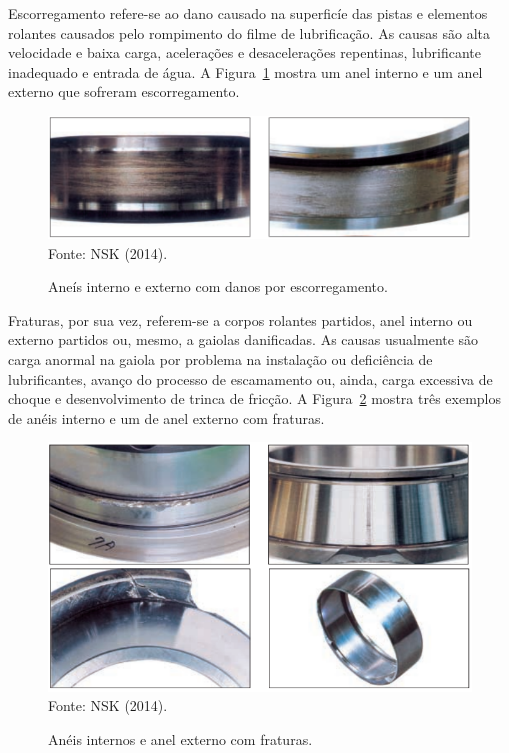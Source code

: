 \documentclass[
	12pt,				
	oneside,			
	a4paper,			
	english,			
	brazil,	
	sumario=abnt-6027-2012		
	]{abntex2ppgsi}
\begin{document}
Escorregamento refere-se ao dano causado na superficíe das pistas e elementos rolantes causados pelo rompimento do filme de lubrificação. As causas são alta velocidade e baixa carga, acelerações e desacelerações repentinas, lubrificante inadequado e entrada de água. A Figura~\ref{escorregamento_nsk} mostra um anel interno e um anel externo que sofreram escorregamento. 

\begin{figure}[H]
\centering
\caption {Aneís interno e externo com danos por escorregamento.}
\includegraphics[width=\textwidth,height=\textheight,keepaspectratio]{escorregamento_nsk} \\
Fonte: NSK (2014).
\label{escorregamento_nsk}
\end{figure}

Fraturas, por sua vez, referem-se a corpos rolantes partidos, anel interno ou externo partidos ou, mesmo, a gaiolas danificadas. As causas usualmente são carga anormal na gaiola por problema na instalação ou deficiência de lubrificantes, avanço do processo de escamamento ou, ainda, carga excessiva de choque e desenvolvimento de trinca de fricção. A Figura~\ref{fraturas_nsk} mostra três exemplos de anéis interno e um de anel externo com fraturas. 

\begin{figure}[H]
\centering
\caption {Anéis internos e anel externo com fraturas.}
\includegraphics[width=\textwidth,height=\textheight,keepaspectratio]{fraturas_nsk} \\
Fonte: NSK (2014).
\label{fraturas_nsk}
\end{figure}
\end{document}
